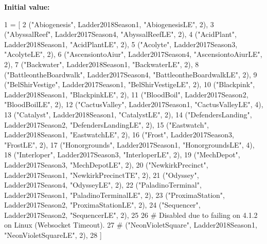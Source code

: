{\bfseries Initial value\+:}
\begin{DoxyCode}
1 =  [
2     (\textcolor{stringliteral}{"Abiogenesis"},          Ladder2018Season1, \textcolor{stringliteral}{"AbiogenesisLE"}, 2),
3     (\textcolor{stringliteral}{"AbyssalReef"},          Ladder2017Season4, \textcolor{stringliteral}{"AbyssalReefLE"}, 2),
4     (\textcolor{stringliteral}{"AcidPlant"},            Ladder2018Season1, \textcolor{stringliteral}{"AcidPlantLE"}, 2),
5     (\textcolor{stringliteral}{"Acolyte"},              Ladder2017Season3, \textcolor{stringliteral}{"AcolyteLE"}, 2),
6     (\textcolor{stringliteral}{"AscensiontoAiur"},      Ladder2017Season4, \textcolor{stringliteral}{"AscensiontoAiurLE"}, 2),
7     (\textcolor{stringliteral}{"Backwater"},            Ladder2018Season1, \textcolor{stringliteral}{"BackwaterLE"}, 2),
8     (\textcolor{stringliteral}{"BattleontheBoardwalk"}, Ladder2017Season4, \textcolor{stringliteral}{"BattleontheBoardwalkLE"}, 2),
9     (\textcolor{stringliteral}{"BelShirVestige"},       Ladder2017Season1, \textcolor{stringliteral}{"BelShirVestigeLE"}, 2),
10     (\textcolor{stringliteral}{"Blackpink"},            Ladder2018Season1, \textcolor{stringliteral}{"BlackpinkLE"}, 2),
11     (\textcolor{stringliteral}{"BloodBoil"},            Ladder2017Season2, \textcolor{stringliteral}{"BloodBoilLE"}, 2),
12     (\textcolor{stringliteral}{"CactusValley"},         Ladder2017Season1, \textcolor{stringliteral}{"CactusValleyLE"}, 4),
13     (\textcolor{stringliteral}{"Catalyst"},             Ladder2018Season1, \textcolor{stringliteral}{"CatalystLE"}, 2),
14     (\textcolor{stringliteral}{"DefendersLanding"},     Ladder2017Season2, \textcolor{stringliteral}{"DefendersLandingLE"}, 2),
15     (\textcolor{stringliteral}{"Eastwatch"},            Ladder2018Season1, \textcolor{stringliteral}{"EastwatchLE"}, 2),
16     (\textcolor{stringliteral}{"Frost"},                Ladder2017Season3, \textcolor{stringliteral}{"FrostLE"}, 2),
17     (\textcolor{stringliteral}{"Honorgrounds"},         Ladder2017Season1, \textcolor{stringliteral}{"HonorgroundsLE"}, 4),
18     (\textcolor{stringliteral}{"Interloper"},           Ladder2017Season3, \textcolor{stringliteral}{"InterloperLE"}, 2),
19     (\textcolor{stringliteral}{"MechDepot"},            Ladder2017Season3, \textcolor{stringliteral}{"MechDepotLE"}, 2),
20     (\textcolor{stringliteral}{"NewkirkPrecinct"},      Ladder2017Season1, \textcolor{stringliteral}{"NewkirkPrecinctTE"}, 2),
21     (\textcolor{stringliteral}{"Odyssey"},              Ladder2017Season4, \textcolor{stringliteral}{"OdysseyLE"}, 2),
22     (\textcolor{stringliteral}{"PaladinoTerminal"},     Ladder2017Season1, \textcolor{stringliteral}{"PaladinoTerminalLE"}, 2),
23     (\textcolor{stringliteral}{"ProximaStation"},       Ladder2017Season2, \textcolor{stringliteral}{"ProximaStationLE"}, 2),
24     (\textcolor{stringliteral}{"Sequencer"},            Ladder2017Season2, \textcolor{stringliteral}{"SequencerLE"}, 2),
25 
26     \textcolor{comment}{# Disabled due to failing on 4.1.2 on Linux (Websocket Timeout).}
27     \textcolor{comment}{# ("NeonVioletSquare",     Ladder2018Season1, "NeonVioletSquareLE", 2),}
28 ]
\end{DoxyCode}
